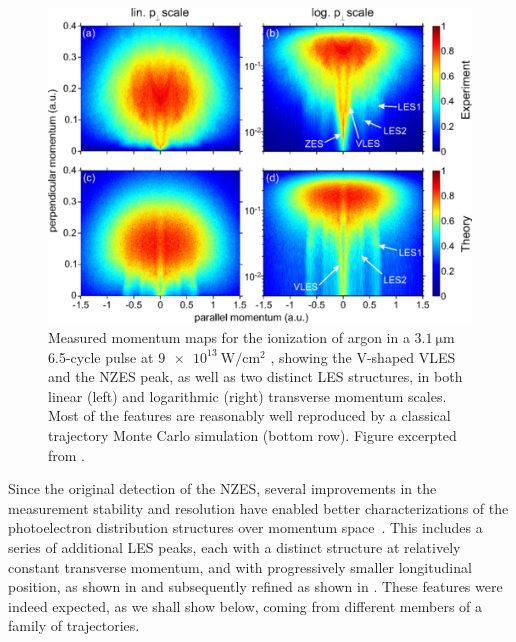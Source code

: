 \begin{figure}[h!t]
  \vspace{2mm}
  \centering
  \subfloat{\label{f6-wolter-original-figure-a}}
  \subfloat{\label{f6-wolter-original-figure-b}}
  \subfloat{\label{f6-wolter-original-figure-c}}
  \subfloat{\label{f6-wolter-original-figure-d}}
  \includegraphics[scale=0.7]{6-LES/Figures/figure6F.png}
  \caption[
  Measured and CTMC high-resolution photoelectron momentum maps showing LES, VLES and ZES structures, observed by Wolter et al.
  ]{
  Measured momentum maps for the ionization of argon in a $\SI{3.1}{\micro\meter}$ 6.5-cycle pulse at $\SI{9e13}{\watt/\centi\meter^2}$ \cite{ZES_paper}, showing the V-shaped VLES and the NZES peak, as well as two distinct LES structures, in both linear (left) and logarithmic (right) transverse momentum scales. Most of the features are reasonably well reproduced by a classical trajectory Monte Carlo simulation (bottom row).
  Figure excerpted from .
  }
\label{f6-wolter-original-figure}
\end{figure}


\pagebreak




Since the original detection of the NZES, several improvements in the measurement stability and resolution have enabled better characterizations of the photoelectron distribution structures over momentum space~\cite{ZES_paper}. This includes a series of additional LES peaks, each with a distinct structure at relatively constant transverse momentum, and with progressively smaller longitudinal position, as shown in  and subsequently refined \cite{Wolter_PRX} as shown in . These features were indeed expected, as we shall show below, coming from different members of a family of trajectories.




